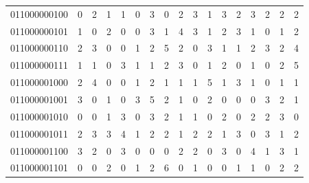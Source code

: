 \documentclass[10pt,a4paper]{article}
\begin{document}
\begin{longtable}{ |c|c|c|c|c|c|c|c|c|c|c|c|c|c|c|c|c| }
    011000000100              & 0                            & 2                                & 1                            & 1                              & 0   & 3   & 0   & 2   & 3   & 1   & 3   & 2   & 3   & 2   & 2   & 2   \\
    011000000101              & 1                            & 0                                & 2                            & 0                              & 0   & 3   & 1   & 4   & 3   & 1   & 2   & 3   & 1   & 0   & 1   & 2   \\
    011000000110              & 2                            & 3                                & 0                            & 0                              & 1   & 2   & 5   & 2   & 0   & 3   & 1   & 1   & 2   & 3   & 2   & 4   \\
    011000000111              & 1                            & 1                                & 0                            & 3                              & 1   & 1   & 2   & 3   & 0   & 1   & 2   & 0   & 1   & 0   & 2   & 5   \\
    011000001000              & 2                            & 4                                & 0                            & 0                              & 1   & 2   & 1   & 1   & 1   & 5   & 1   & 3   & 1   & 0   & 1   & 1   \\
    011000001001              & 3                            & 0                                & 1                            & 0                              & 3   & 5   & 2   & 1   & 0   & 2   & 0   & 0   & 0   & 3   & 2   & 1   \\
    011000001010              & 0                            & 0                                & 1                            & 3                              & 0   & 3   & 2   & 1   & 1   & 0   & 2   & 0   & 2   & 2   & 3   & 0   \\
    011000001011              & 2                            & 3                                & 3                            & 4                              & 1   & 2   & 2   & 1   & 2   & 2   & 1   & 3   & 0   & 3   & 1   & 2   \\
    011000001100              & 3                            & 2                                & 0                            & 3                              & 0   & 0   & 0   & 2   & 2   & 0   & 3   & 0   & 4   & 1   & 3   & 1   \\
    011000001101              & 0                            & 0                                & 2                            & 0                              & 1   & 2   & 6   & 0   & 1   & 0   & 0   & 1   & 1   & 0   & 2   & 2   \\

\end{longtable}
\end{document}
